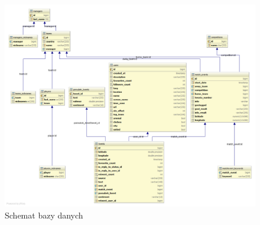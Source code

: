 \begin{figure}[ht!]
\centering
\includegraphics[width=160mm]{img/db-schema-intellij.png}
\caption{Schemat bazy danych}
\label{image:schemat-bazy}
\end{figure}